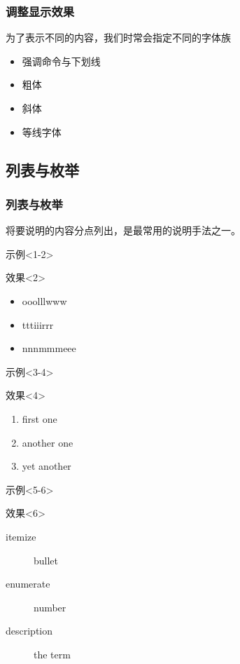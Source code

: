 \begin{frame}
	\frametitle{调整显示效果}
	为了表示不同的内容，我们时常会指定不同的字体族
	\begin{itemize}
		\item<2-|alert@2> 强调命令与下划线
		
		\item<3-|alert@3> 粗体
		
		\item<4-|alert@4> 斜体
		
		\item<5-|alert@5> 等线字体
		
	\end{itemize}
\end{frame}

\subsection{列表与枚举}

\begin{frame}
	\frametitle{列表与枚举}
	将要说明的内容分点列出，是最常用的说明手法之一。
	\begin{overprint}
		\begin{block}{示例}<1-2>
			
		\end{block}
		\begin{block}{效果}<2>
			\begin{itemize}
				\item ooolllwww
				\item tttiiirrr
				\item nnnmmmeee
			\end{itemize}
		\end{block}
		\begin{block}{示例}<3-4>
			
		\end{block}
		\begin{block}{效果}<4>
			\begin{enumerate}
				\item first one
				\item another one
				\item yet another
			\end{enumerate}
		\end{block}
		\begin{block}{示例}<5-6>
			
		\end{block}
		\begin{block}{效果}<6>
			\begin{description}
				\item[itemize] bullet
				\item[enumerate] number
				\item[description] the term
			\end{description}
		\end{block}
	\end{overprint}
\end{frame}

